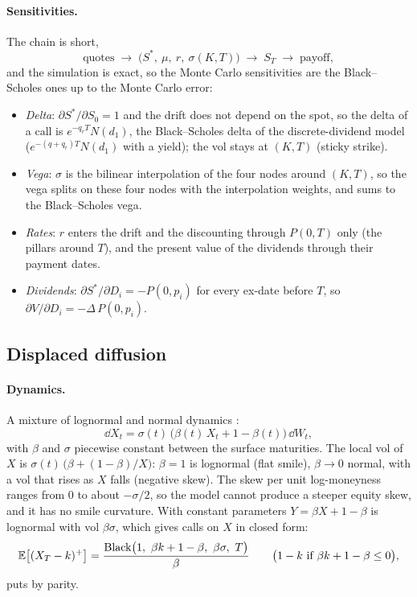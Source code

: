 \paragraph{Sensitivities.} The chain is short,
\[
  \text{quotes} \;\to\; \big(S^*,\ \mu,\ r,\ \sigma(K, T)\big) \;\to\; S_T \;\to\; \text{payoff},
\]
and the simulation is exact, so the Monte Carlo sensitivities are the Black--Scholes ones up to the Monte Carlo error:
\begin{itemize}[nosep]
  \item \emph{Delta}: $\partial S^*/\partial S_0 = 1$ and the drift does not depend on the spot, so the delta of a call is
        $e^{-q_r T} N(d_1)$, the Black--Scholes delta of the discrete-dividend model ($e^{-(q + q_r)T} N(d_1)$ with a yield); the vol
        stays at $(K, T)$ (sticky strike).
  \item \emph{Vega}: $\sigma$ is the bilinear interpolation of the four nodes around $(K, T)$, so the vega splits on these four
        nodes with the interpolation weights, and sums to the Black--Scholes vega.
  \item \emph{Rates}: $r$ enters the drift and the discounting through $P(0,T)$ only (the pillars around $T$), and the
        present value of the dividends through their payment dates.
  \item \emph{Dividends}: $\partial S^*/\partial D_i = -P(0,p_i)$ for every ex-date before $T$, so $\partial V/\partial D_i = -\Delta\,P(0, p_i)$.
\end{itemize}

\subsection{Displaced diffusion}\label{sec:mp-dd}
\paragraph{Dynamics.} A mixture of lognormal and normal dynamics \citep{rubinstein1983}:
\[
  \dd X_t = \sigma(t)\,\big(\beta(t)\,X_t + 1 - \beta(t)\big)\,\dd W_t ,
\]
with $\beta$ and $\sigma$ piecewise constant between the surface maturities. The local vol of $X$ is
$\sigma(t)\,\big(\beta + (1 - \beta)/X\big)$: $\beta = 1$ is lognormal (flat smile), $\beta \to 0$ normal, with a vol that rises as $X$ falls
(negative skew). The skew per unit log-moneyness ranges from 0 to about $-\sigma/2$, so the model cannot produce a
steeper equity skew, and it has no smile curvature. With constant parameters $Y = \beta X + 1 - \beta$ is lognormal with vol
$\beta\sigma$, which gives calls on $X$ in closed form:
\[
  \E\big[(X_T - k)^+\big] = \frac{\mathrm{Black}\big(1,\ \beta k + 1 - \beta,\ \beta\sigma,\ T\big)}{\beta}
  \qquad\big(1 - k \text{ if } \beta k + 1 - \beta \le 0\big),
\]
puts by parity.

